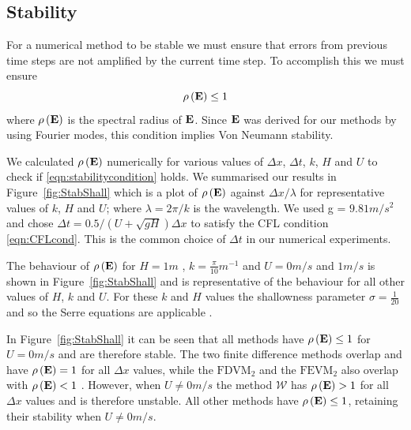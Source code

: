 \subsection{Stability}
For a numerical method to be stable we must ensure that errors from previous time steps are not amplified by the current time step. To accomplish this we must ensure 
\begin{equation}
\rho\left(\mathbf{E} \right) \le 1
\label{eqn:stabilitycondition}
\end{equation}
where $\rho\left(\mathbf{E} \right)$ is the spectral radius of $\mathbf{E}$. Since $\mathbf{E}$ was derived for our methods by using Fourier modes, this condition implies Von Neumann stability. 

We calculated $\rho\left(\mathbf{E} \right)$ numerically for various values of $\Delta x$, $\Delta t$, $k$, $H$ and $U$ to check if \eqref{eqn:stabilitycondition} holds. We summarised our results in Figure~\ref{fig:StabShall} which is a plot of $\rho\left(\mathbf{E}\right)$ against $\Delta x / \lambda$ for representative values of $k$, $H$ and $U$; where $\lambda = 2 \pi / k$ is the wavelength. We used g = $9.81m/s^2$ and chose $\Delta t = 0.5 / \left(U + \sqrt{gH}\right) \Delta x$ to satisfy the CFL condition \eqref{eqn:CFLcond}. This is the common choice of $\Delta t$ in our numerical experiments.

The behaviour of $\rho\left(\mathbf{E}\right)$ for $H=1 m$ , $k = \frac{\pi}{10} m^{-1}$ and $U = 0 m/s$ and $1 m/s$ is shown in Figure~\ref{fig:StabShall} and is representative of the behaviour for all other values of $H$, $k$ and $U$. For these $k$ and $H$ values the shallowness parameter $\sigma = \frac{1}{20}$ and so the Serre equations are applicable \cite{Barthelemy-2004-315}. 

In Figure~\ref{fig:StabShall} it can be seen that all methods have $\rho\left(\mathbf{E} \right) \le 1$ for $U=0m/s$ and are therefore stable. The two finite difference methods overlap and have $\rho\left(\mathbf{E} \right) = 1$ for all $\Delta x$ values, while the $\text{FDVM}_2$ and the $\text{FEVM}_2$ also overlap with $\rho\left(\mathbf{E} \right) < 1$ . However, when $U \neq 0m/s$ the method $\mathcal{W}$ has $\rho\left(\mathbf{E} \right) > 1$ for all $\Delta x$ values and is therefore unstable. All other methods have $\rho\left(\mathbf{E} \right) \le 1$, retaining their stability when $U \neq 0m/s$.

